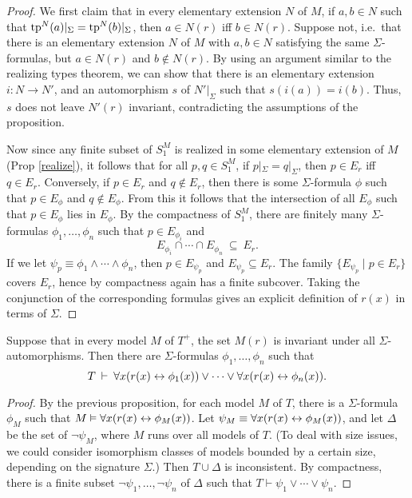 \begin{proof} We first claim that in every elementary extension $N$ of
  $M$, if $a,b\in N$ such that $\mathrm{tp}^{N}(a)|_\Sigma=\mathrm{tp}^{N}(b)|_\Sigma$,
  then $a\in N(r)$ iff $b\in N(r)$.  Suppose not, i.e.\ that there is
  an elementary extension $N$ of $M$ with $a,b\in N$ satisfying the
  same $\Sigma$-formulas, but $a\in N(r)$ and $b\not\in N(r)$.  By
  using an argument similar to the realizing types theorem, we can
  show that there is an elementary extension $i:N\to N'$, and an
  automorphism $s$ of $N'|_\Sigma$ such that $s(i(a))=i(b)$.  Thus,
  $s$ does not leave $N'(r)$ invariant, contradicting the assumptions
  of the proposition.

  Now since any finite subset of $S_1^M$ is realized in some
  elementary extension of $M$ (Prop \ref{realize}), it follows that
  for all $p,q\in S_1^M$, if $p|_\Sigma=q|_\Sigma$, then $p\in E_r$
  iff $q\in E_r$.  Conversely, if $p\in E_r$ and $q\not\in E_r$, then
  there is some $\Sigma$-formula $\phi$ such that $p\in E_\phi$ and
  $q\not\in E_\phi$.  From this it follows that the intersection of
  all $E_\phi$ such that $p\in E_\phi$ lies in $E_\phi$.  By the
  compactness of $S_1^M$, there are finitely many $\Sigma$-formulas
  $\phi _1,\dots ,\phi _n$ such that $p\in E_{\phi _i}$ and
  \[ E_{\phi _i}\cap\cdots\cap E_{\phi _n} \: \subseteq \: E_r .\] If
  we let $\psi _p\equiv \phi _1\wedge\cdots\wedge\phi _n$, then
  $p\in E_{\psi _p}$ and $E_{\psi _p}\subseteq E_r$.  The family
  $\{ E_{\psi _p}\mid p\in E_r \}$ covers $E_r$, hence by compactness
  again has a finite subcover.  Taking the conjunction of the
  corresponding formulas gives an explicit definition of $r(x)$ in
  terms of $\Sigma$.  \end{proof}

\begin{thm}[Svenonius] Suppose that in every model $M$ of $T^+$, the
  set $M(r)$ is invariant under all $\Sigma$-automorphisms.  Then
  there are $\Sigma$-formulas $\phi _1,\dots ,\phi _n$ such that
  \[ T \:\vdash \: \forall x(r(x)\leftrightarrow \phi _1(x))\vee\cdots\vee
    \forall x(r(x)\leftrightarrow\phi _n(x)) .\]
\end{thm}

\begin{proof} By the previous proposition, for each model $M$ of $T$,
  there is a $\Sigma$-formula $\phi _M$ such that
  $M\vDash \forall x(r(x)\leftrightarrow \phi _M(x))$.  Let
  $\psi _M\equiv \forall x(r(x)\leftrightarrow \phi _M(x))$, and let $\Delta$ be
  the set of $\neg \psi _M$, where $M$ runs over all models of $T$.
  (To deal with size issues, we could consider isomorphism classes of
  models bounded by a certain size, depending on the signature
  $\Sigma$.)  Then $T\cup \Delta$ is inconsistent.  By compactness,
  there is a finite subset $\neg \psi _1,\dots ,\neg \psi _n$ of
  $\Delta$ such that $T\vdash \psi _1\vee\cdots\vee \psi _n$.
\end{proof}

